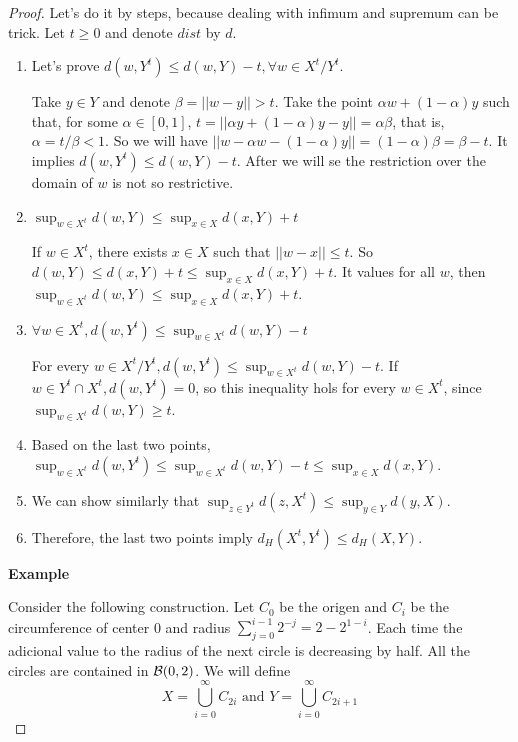\begin{proof}

Let's do it by steps, because dealing with infimum and supremum can be trick.
Let $t \ge 0$ and denote $dist$ by $d$. 

\begin{enumerate}
    \item Let's prove $d(w,Y^t) \le d(w,Y) - t, \forall w \in X^t/Y^t$. 
    
    Take $y \in Y$ and denote $\beta = ||w - y|| > t$. Take the point $\alpha
    w + (1 - \alpha)y$ such that, for some $\alpha \in [0,1]$, $t = ||\alpha y
    + (1-\alpha)y - y|| = \alpha\beta$, that is, $\alpha = t/\beta < 1$. So we
    will have $||w - \alpha w - (1 - \alpha)y|| = (1 - \alpha)\beta = \beta -
    t$. It implies $d(w,Y^t) \le d(w,Y) - t$. After we will se the restriction
    over the domain of $w$ is not so restrictive. 

    \item  $\sup_{w \in X^t} d(w, Y) \le \sup_{x \in X} d(x,Y) + t$ 
    
    If $w \in X^t$, there exists $x \in X$ such that $||w - x|| \le t$.
    So $d(w, Y) \le d(x,Y) + t \le \sup_{x \in X} d(x,Y) + t$. It values for
    all $w$, then $\sup_{w \in X^t} d(w, Y) \le \sup_{x \in X} d(x,Y) + t$.

    \item $\forall w \in X^t, d(w, Y^t) \le \sup_{w \in X^t} d(w, Y) - t$
    
    For every $w \in X^t/Y^t, d(w, Y^t) \le \sup_{w \in X^t} d(w, Y) -
    t$. If $w \in Y^t \cap X^t, d(w,Y^t) = 0$, so this inequality hols for
    every $w \in X^t$, since $\sup_{w \in X^t} d(w, Y) \ge t$.
    
    \item Based on the last two points, $\sup_{w \in X^t} d(w, Y^t) \le \sup_{w \in
    X^t} d(w, Y) - t \le \sup_{x \in X} d(x, Y)$. 

    \item We can show similarly that $\sup_{z \in Y^t} d(z, X^t) \le \sup_{y
    \in Y} d(y, X)$. 

    \item Therefore, the last two points imply $d_H(X^t, Y^t) \le d_H(X,Y)$. 

\end{enumerate}

\textbf{Example}

Consider the following construction. Let $C_0$ be the origen and $C_i$ be the
circumference of center 0 and radius $\sum_{j=0}^{i-1} 2^{-j} = 2 - 2^{1-i}$.
Each time the adicional value to the radius of the next circle is decreasing
by half. All the circles are contained in $\mathcal{B}(0,2)$. We will define $$X =
\bigcup_{i=0}^{\infty} C_{2i} \text{ and } Y =
\bigcup_{i=0}^{\infty} C_{2i + 1}$$


\end{proof}
